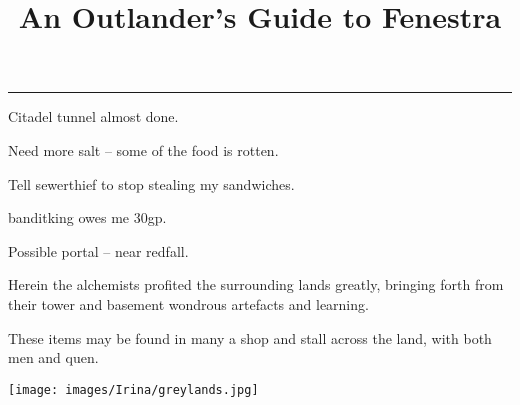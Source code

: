 \documentclass[a4paper,openany]{book}
\title{An Outlander's Guide to Fenestra}
\begin{document}
\frontmatter


\hrule

\vspace{2em}

Citadel tunnel almost done.

Need more salt -- some of the food is rotten.

Tell \gls{sewerthief} to stop stealing my sandwiches.

\Gls{banditking} owes me 30gp.

Possible portal -- near \gls{redfall}.

\pagebreak



\begin{center}
\begin{minipage}{.7\textwidth}
\Large
Herein the alchemists profited the surrounding lands greatly, bringing forth from their tower and basement wondrous artefacts and learning.

These items may be found in many a shop and stall across the land, with both men and quen.

\end{minipage}
\end{center}

\pagebreak



\pagebreak

\texttt{[image: images/Irina/greylands.jpg]}

\pagebreak



\pagebreak


\pagebreak


\end{document}
